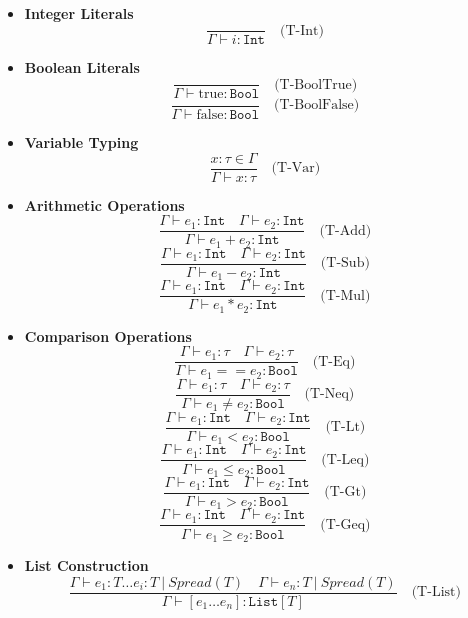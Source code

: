 \documentclass[letterpaper,12pt]{article}
\begin{document}
\begin{itemize}
    \item \textbf{Integer Literals}
    \[
    \frac{}{\Gamma \vdash i : \texttt{Int}} \quad \text{(T-Int)}
    \]
    
    \item \textbf{Boolean Literals}
    \[
    \frac{}{\Gamma \vdash \text{true} : \texttt{Bool}} \quad \text{(T-BoolTrue)}
    \]
    \[
    \frac{}{\Gamma \vdash \text{false} : \texttt{Bool}} \quad \text{(T-BoolFalse)}
    \]
    
    \item \textbf{Variable Typing}
    \[
    \frac{x : \tau \in \Gamma}{\Gamma \vdash x : \tau} \quad \text{(T-Var)}
    \]
    
    \item \textbf{Arithmetic Operations}
    \[
    \frac{\Gamma \vdash e_1 : \texttt{Int} \quad \Gamma \vdash e_2 : \texttt{Int}}{\Gamma \vdash e_1 + e_2 : \texttt{Int}} \quad \text{(T-Add)}
    \]
    \[
    \frac{\Gamma \vdash e_1 : \texttt{Int} \quad \Gamma \vdash e_2 : \texttt{Int}}{\Gamma \vdash e_1 - e_2 : \texttt{Int}} \quad \text{(T-Sub)}
    \]
    \[
    \frac{\Gamma \vdash e_1 : \texttt{Int} \quad \Gamma \vdash e_2 : \texttt{Int}}{\Gamma \vdash e_1 * e_2 : \texttt{Int}} \quad \text{(T-Mul)}
    \]
    
    \item \textbf{Comparison Operations}
    \[
    \frac{\Gamma \vdash e_1 : \tau \quad \Gamma \vdash e_2 : \tau}{\Gamma \vdash e_1 == e_2 : \texttt{Bool}} \quad \text{(T-Eq)}
    \]
    \[
    \frac{\Gamma \vdash e_1 : \tau \quad \Gamma \vdash e_2 : \tau}{\Gamma \vdash e_1 \ne e_2 : \texttt{Bool}} \quad \text{(T-Neq)}
    \]
    \[
    \frac{\Gamma \vdash e_1 : \texttt{Int} \quad \Gamma \vdash e_2 : \texttt{Int}}{\Gamma \vdash e_1 < e_2 : \texttt{Bool}} \quad \text{(T-Lt)}
    \]
    \[
    \frac{\Gamma \vdash e_1 : \texttt{Int} \quad \Gamma \vdash e_2 : \texttt{Int}}{\Gamma \vdash e_1 \leq e_2 : \texttt{Bool}} \quad \text{(T-Leq)}
    \]
    \[
    \frac{\Gamma \vdash e_1 : \texttt{Int} \quad \Gamma \vdash e_2 : \texttt{Int}}{\Gamma \vdash e_1 > e_2 : \texttt{Bool}} \quad \text{(T-Gt)}
    \]
    \[
    \frac{\Gamma \vdash e_1 : \texttt{Int} \quad \Gamma \vdash e_2 : \texttt{Int}}{\Gamma \vdash e_1 \geq e_2 : \texttt{Bool}} \quad \text{(T-Geq)}
    \]
    
    \item \textbf{List Construction}
    \[
    \frac{
        \Gamma \vdash e_1 : T \dots e_i : T\ | \ Spread(T) \quad \Gamma \vdash e_n : T\ | \ Spread(T)
    }{
        \Gamma \vdash [e_1 \dots e_n] : \texttt{List}[T]
    } \quad \text{(T-List)}
    \]
    

\end{itemize}
\end{document}

